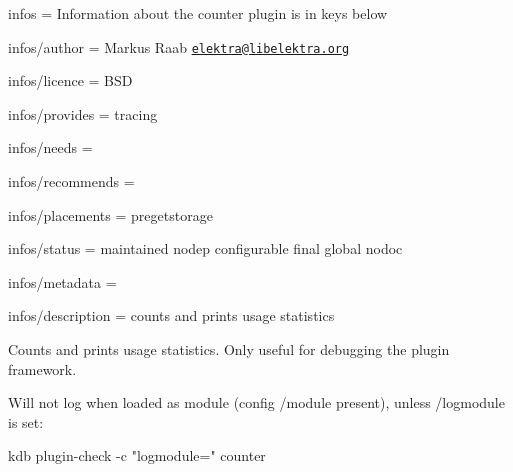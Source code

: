 
\begin{DoxyItemize}
\item infos = Information about the counter plugin is in keys below
\item infos/author = Markus Raab \href{mailto:elektra@libelektra.org}{\tt elektra@libelektra.\+org}
\item infos/licence = B\+SD
\item infos/provides = tracing
\item infos/needs =
\item infos/recommends =
\item infos/placements = pregetstorage
\item infos/status = maintained nodep configurable final global nodoc
\item infos/metadata =
\item infos/description = counts and prints usage statistics
\end{DoxyItemize}

Counts and prints usage statistics. Only useful for debugging the plugin framework.

Will not log when loaded as module (config {\ttfamily /module} present), unless {\ttfamily /logmodule} is set\+:


\begin{DoxyCode}
kdb plugin-check -c "logmodule=" counter
\end{DoxyCode}
 